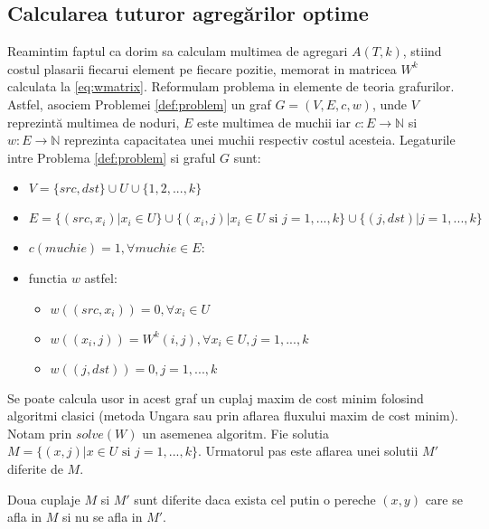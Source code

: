 \subsection{Calcularea tuturor agregărilor optime}
Reamintim faptul ca dorim sa calculam multimea de agregari $A(T, k)$, stiind costul plasarii 
fiecarui element pe fiecare pozitie, memorat in matricea $W^k$ calculata la \eqref{eq:wmatrix}. 
Reformulam problema in elemente de teoria grafurilor. Astfel, asociem Problemei \ref{def:problem} 
un graf $G = (V, E, c, w)$, unde $V$ reprezintă multimea de noduri, $E$ este multimea de muchii iar
$c \colon E \to \mathbb{N}$ si $w \colon E \to \mathbb{N}$ reprezinta capacitatea unei muchii
respectiv costul acesteia. Legaturile intre Problema \ref{def:problem} si graful $G$ sunt:
\begin{itemize}
  \item $V = \{src, dst\} \cup U \cup \{1, 2,..., k\}$
  \item $E = \{(src, x_i) | x_i \in U\} \cup \{(x_i, j) | x_i \in U \text{ si } j = 1,...,k\} \cup 
    \{(j, dst) | j = 1,...,k\}$  
  \item $c(muchie) = 1, \forall muchie \in E$:
  \item functia $w$ astfel:
  \begin{itemize}
    \item $w((src, x_i)) = 0, \forall x_i \in U$
    \item $w((x_i, j)) = W^k(i, j), \forall x_i \in U, j = 1,...,k$
    \item $w((j, dst)) = 0, j = 1,...,k$
  \end{itemize}
\end{itemize}

Se poate calcula usor in acest graf un cuplaj maxim de cost minim folosind algoritmi clasici (metoda
Ungara \cite{hungarianmethod} sau prin aflarea fluxului maxim de cost minim\cite{flowassignment}).
Notam prin $solve(W)$ un asemenea algoritm.
Fie solutia $M = \{(x, j) | x \in U \text{ si } j = 1,...,k\}$. Urmatorul pas este aflarea unei
solutii $M'$ diferite de $M$.

\begin{proposition}
Doua cuplaje $M$ si $M'$ sunt diferite daca exista cel putin o pereche $(x, y)$ care se afla in $M$
si nu se afla in $M'$.
\end{proposition}

